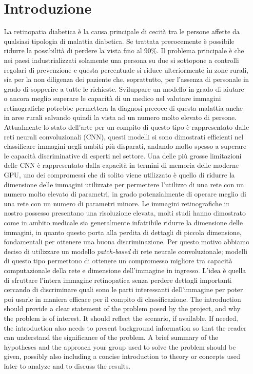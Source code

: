 \section{Introduzione}
La retinopatia diabetica è la causa principale di cecità tra le persone affette da qualsiasi tipologia di malattia diabetica. Se trattata precocemente è possibile ridurre la possibilità di perdere la vista fino al 90\%.
Il problema principale è che nei paesi industrializzati solamente una persona su due si sottopone a controlli regolari di prevenzione e questa percentuale si riduce ulteriormente in zone rurali, sia per la non diligenza dei paziente che, soprattutto, per l'assenza di personale in grado di sopperire a tutte le richieste.
Sviluppare un modello in grado di aiutare o ancora meglio superare le capacità di un medico nel valutare immagini retinografiche potrebbe permettera la diagnosi precoce di questa malattia anche in aree rurali salvando quindi la vista ad un numero molto elevato di persone.
Attualmente lo stato dell'arte per un compito di questo tipo è rappresentato dalle reti neurali convoluzionali (CNN), questi modelli si sono dimostrati efficienti nel classificare immagini negli ambiti più disparati, andando molto spesso a superare le capacità discriminative di esperti nel settore.
Una delle più grosse limitazioni delle CNN è rappresentato dalla capacità in termini di memoria delle moderne GPU, uno dei compromessi che di solito viene utilizzato è quello di ridurre la dimensione delle immagini utilizzate per permettere l'utilizzo di una rete con un numero molto elevato di parametri, in grado potenzialmente di operare meglio di una rete con un numero di parametri minore.
Le immagini retinografiche in nostro possesso presentano una risoluzione elevata, molti studi hanno dimostrato come in ambito medicale sia generalmente infattibile ridurre la dimensione delle immagini, in quanto questo porta alla perdita di dettagli di piccola dimensione, fondamentali per ottenere una buona discriminazione.
Per questo motivo abbiamo deciso di utilizzare un modello \textit{patch-based} di rete neurale convoluzionale; modelli di questo tipo permettono di ottenere un compromesso migliore tra capacità computazionale della rete e dimensione dell'immagine in ingresso.
L'idea è quella di sfruttare l'intera immagine retinopatica senza perdere dettagli importanti cercando di discriminare quali sono le parti interessanti dell'immagine per poter poi usarle in maniera efficace per il compito di classificazione.
The introduction should provide a clear statement of the problem posed by the project, and why the problem is of interest. It should reflect the scenario, if available. If needed, the introduction also needs to present background information so that the reader can understand the significance of the problem. A brief summary of the hypotheses and the approach your group used to solve the problem should be given, possibly also including a concise introduction to theory or concepts used later to analyze and to discuss the results.


